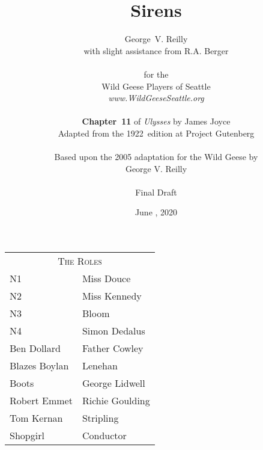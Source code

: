 


\title{\Huge Sirens}
\author{George~V. Reilly\\
{\small with slight assistance from R.A. Berger}\\
\\
{\small for the}\\
Wild Geese Players of Seattle\\
{\textit{www.WildGeeseSeattle.org}}\\
\\
{\small \textbf{Chapter~11} of \textit{Ulysses} by James Joyce}\\
{\small Adapted from the 1922~edition at Project Gutenberg}
\\
\\
{\small Based upon the 2005 adaptation for the Wild Geese by}\\
{\small George V. Reilly}\\
\\
{\small Final Draft}}
\date{June , 2020}
\raggedbottom



\maketitle
\thispagestyle{empty}
\pagebreak

\begin{tabular}{lp{10cm}}
    \multicolumn{2}{c}{\Large \textsc{The Roles}} \\
N1              & Miss Douce \\
N2              & Miss Kennedy \\
N3              & Bloom \\
N4              & Simon Dedalus \\
Ben Dollard     & Father Cowley \\
Blazes Boylan   & Lenehan \\
Boots           & George Lidwell \\
Robert Emmet    & Richie Goulding \\
Tom Kernan      & Stripling \\
Shopgirl        & Conductor \\
\end{tabular}

\bigskip

